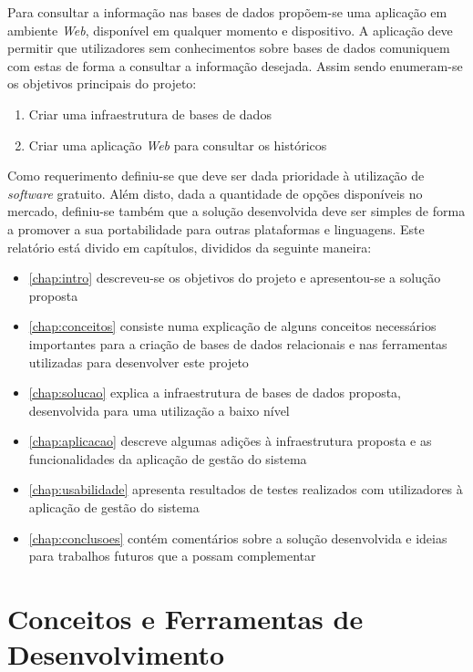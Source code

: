 \documentclass[11pt,twoside,a4paper]{report}
\begin{document}
Para consultar a informação nas bases de dados propõem-se uma aplicação em ambiente \textit{Web}, disponível em qualquer momento e dispositivo. A aplicação deve permitir que utilizadores sem conhecimentos sobre bases de dados comuniquem com estas de forma a consultar a informação desejada. Assim sendo enumeram-se os objetivos principais do projeto:
\begin{enumerate}
	\item Criar uma infraestrutura de bases de dados
	\item Criar uma aplicação \textit{Web} para consultar os históricos
\end{enumerate}
Como requerimento definiu-se que deve ser dada prioridade à utilização de \textit{software} gratuito. Além disto, dada a quantidade de opções disponíveis no mercado, definiu-se também que a solução desenvolvida deve ser simples de forma a promover a sua portabilidade para outras plataformas e linguagens.
\newpage
Este relatório está divido em capítulos, divididos da seguinte maneira:
\begin{itemize}
	\item \autoref{chap:intro} descreveu-se os objetivos do projeto e apresentou-se a solução proposta
	\item \autoref{chap:conceitos} consiste numa explicação de alguns conceitos necessários importantes para a criação de bases de dados relacionais e nas ferramentas utilizadas para desenvolver este projeto
	\item \autoref{chap:solucao} explica a infraestrutura de bases de dados proposta, desenvolvida para uma utilização a baixo nível
	\item \autoref{chap:aplicacao} descreve algumas adições à infraestrutura proposta e as funcionalidades da aplicação de gestão do sistema
	\item \autoref{chap:usabilidade} apresenta resultados de testes realizados com utilizadores à aplicação de gestão do sistema
	\item \autoref{chap:conclusoes} contém comentários sobre a solução desenvolvida e ideias para trabalhos futuros que a possam complementar
\end{itemize}

\cleardoublepage
\chapter{Conceitos e Ferramentas de Desenvolvimento}
\label{chap:conceitos}
\end{document}
